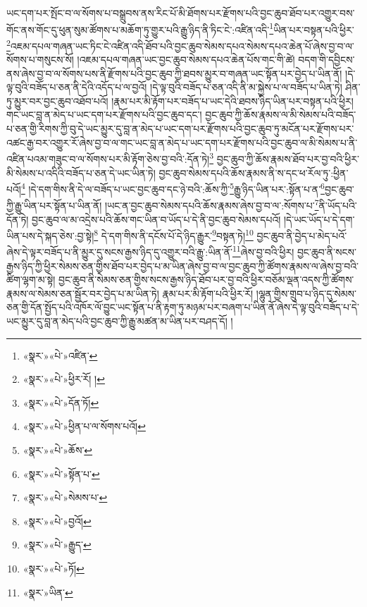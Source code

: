 ཡང་དག་པར་སྤོང་བ་ལ་སོགས་པ་བསྒྲུབས་ནས་རིང་པོ་མི་ཐོགས་པར་རྫོགས་པའི་བྱང་ཆུབ་ཐོབ་པར་འགྱུར་བས་གོང་ནས་གོང་དུ་ཕུན་སུམ་ཚོགས་པ་མཆོག་ཏུ་གྱུར་པའི་རྒྱུ་ཉིད་ནི་ཏིང་ངེ་:འཛིན་འདི་\footnote{«སྣར་»«པེ་»འཛིན་}ཡིན་པར་བསྟན་པའི་ཕྱིར་\footnote{«སྣར་»«པེ་»ཕྱིར་རོ། །}འཇམ་དཔལ་གཞན་ཡང་ཏིང་ངེ་འཛིན་འདི་ཐོབ་པའི་བྱང་ཆུབ་སེམས་དཔའ་སེམས་དཔའ་ཆེན་པོ་ཞེས་བྱ་བ་ལ་སོགས་པ་གསུངས་སོ། །འཇམ་དཔལ་གཞན་ཡང་བྱང་ཆུབ་སེམས་དཔའ་ཆེན་པོས་གང་གི་ཚེ། བདག་གི་དབྱིངས་ནས་ཞེས་བྱ་བ་ལ་སོགས་པས་ནི་རྫོགས་པའི་བྱང་ཆུབ་ཀྱི་ཐབས་མྱུར་བ་གཞན་ཡང་སྟོན་པར་བྱེད་པ་ཡིན་ནོ། །དེ་ལྟ་བུའི་བཟོད་པ་ཅན་ནི་དེའི་འདོད་པ་ལ་བྱའོ། །དེ་ལྟ་བུའི་བཟོད་པ་ཅན་འདི་ནི་མ་སྐྱེས་པ་ལ་བཟོད་པ་ཡིན་ཏེ། ཤིན་ཏུ་མྱུར་བར་བྱང་ཆུབ་འཐོབ་པའོ། །རྣམ་པར་མི་རྟོག་པར་བཟོད་པ་ཡང་དེའི་ཐབས་ཉིད་ཡིན་པར་བསྟན་པའི་ཕྱིར། གང་ཡང་བླ་ན་མེད་པ་ཡང་དག་པར་རྫོགས་པའི་བྱང་ཆུབ་དང་། བྱང་ཆུབ་ཀྱི་ཆོས་རྣམས་ལ་མི་སེམས་པའི་བཟོད་པ་ཅན་གྱི་རིགས་ཀྱི་བུ་དེ་ཡང་མྱུར་དུ་བླ་ན་མེད་པ་ཡང་དག་པར་རྫོགས་པའི་བྱང་ཆུབ་ཏུ་མངོན་པར་རྫོགས་པར་འཚང་རྒྱ་བར་འགྱུར་རོ་ཞེས་བྱ་བ་ལ་གང་ཡང་བླ་ན་མེད་པ་ཡང་དག་པར་རྫོགས་པའི་བྱང་ཆུབ་ལ་མི་སེམས་པ་ནི་འཛིན་པའམ་གཟུང་བ་ལ་སོགས་པར་མི་རྟོག་ཅེས་བྱ་བའི་:དོན་ཏེ།\footnote{«སྣར་»«པེ་»དོན་ཏོ།} བྱང་ཆུབ་ཀྱི་ཆོས་རྣམས་ཐོབ་པར་བྱ་བའི་ཕྱིར་མི་སེམས་པ་འདིའི་བཟོད་པ་ཅན་དེ་ཡང་ཡིན་ཏེ། བྱང་ཆུབ་སེམས་དཔའི་ཆོས་རྣམས་ནི་ས་དང་ཕ་རོལ་ཏུ་:ཕྱིན་པའོ།\footnote{«སྣར་»«པེ་»ཕྱིན་པ་ལ་སོགས་པའོ།} །དེ་དག་གིས་ནི་དེ་ལ་བཟོད་པ་ཡང་བྱང་ཆུབ་དང་ཉེ་བའི་:ཆོས་ཀྱི་\footnote{«སྣར་»«པེ་»ཆོས་}རྒྱུ་ཉིད་ཡིན་པར་:སྟོན་པ་ན་\footnote{«སྣར་»«པེ་»སྟོན་པ་}བྱང་ཆུབ་ཀྱི་རྒྱུ་ཡིན་པར་སྟོན་པ་ཡིན་ནོ། །ཡང་ན་བྱང་ཆུབ་སེམས་དཔའི་ཆོས་རྣམས་ཞེས་བྱ་བ་ལ་:སོགས་པ་\footnote{«སྣར་»«པེ་»སེམས་པ་}ནི་ཡོད་པའི་དོན་ཏེ། བྱང་ཆུབ་ལ་མ་འདྲེས་པའི་ཆོས་གང་ཡིན་བ་ཡོད་པ་དེ་ནི་བྱང་ཆུབ་སེམས་དཔའོ། །དེ་ཡང་ཡོད་པ་དེ་དག་ཡིན་པས་དེ་སྐད་ཅེས་:བྱ་སྟེ།\footnote{«སྣར་»«པེ་»བྱའོ།} དེ་དག་གིས་ནི་དངོས་པོ་དེ་ཉིད་རྒྱུར་\footnote{«སྣར་»«པེ་»རྒྱུད་}བསྟན་ཏེ།\footnote{«སྣར་»«པེ་»ཏོ།} བྱང་ཆུབ་ནི་བྱེད་པ་མེད་པའོ་ཞེས་དེ་ལྟར་བཟོད་པ་ནི་མྱུར་དུ་སངས་རྒྱས་ཉིད་དུ་འགྱུར་བའི་རྒྱུ་:ཡིན་ནོ་\footnote{«སྣར་»ཡིན་}ཞེས་བྱ་བའི་ཕྱིར། བྱང་ཆུབ་ནི་སངས་རྒྱས་ཉིད་ཀྱི་ཕྱིར་སེམས་ཅན་གྱིས་ཐོབ་པར་བྱེད་པ་མ་ཡིན་ཞེས་བྱ་བ་ལ་བྱང་ཆུབ་ཀྱི་ཚོགས་རྣམས་ལ་ཞེས་བྱ་བའི་ཚིག་ལྷག་མ་སྟེ། བྱང་ཆུབ་ནི་སེམས་ཅན་གྱིས་སངས་རྒྱས་ཉིད་ཐོབ་པར་བྱ་བའི་ཕྱིར་བཅོམ་ལྡན་འདས་ཀྱི་ཚོགས་རྣམས་ལ་སེམས་ཅན་སྦྱོར་བར་བྱེད་པ་མ་ཡིན་ཏེ། རྣམ་པར་མི་རྟོག་པའི་ཕྱིར་རོ། །ལྷུན་གྱིས་གྲུབ་པ་ཉིད་དུ་སེམས་ཅན་གྱི་དོན་སྤྱོད་པའི་འཁོར་ལོ་བྱུང་ཡང་སྟོན་པ་ནི་རྟག་ཏུ་མཉམ་པར་བཞག་པ་ཡིན་ནོ་ཞེས་དེ་ལྟ་བུའི་བཟོད་པ་དེ་ཡང་མྱུར་དུ་བླ་ན་མེད་པའི་བྱང་ཆུབ་ཀྱི་རྒྱུ་མཚན་མ་ཡིན་པར་བཤད་དོ། །
